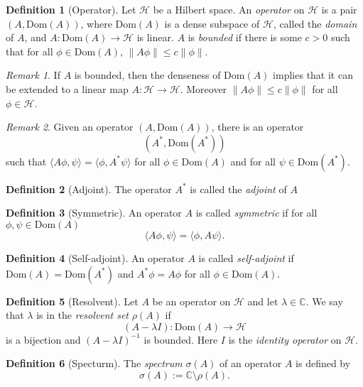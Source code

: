 \documentclass[11pt]{amsart}
\numberwithin{equation}{section}
\theoremstyle{plain}
\theoremstyle{definition}
\newtheorem{defn}{Definition}[subsection]
\theoremstyle{remark}
\newtheorem{rem}{Remark}[subsection]
\newcommand{\calH}{\mathcal{H}}
\begin{document}
\begin{defn}[Operator]
Let $\calH$ be a Hilbert space. An \emph{operator} on $\calH$ is a pair $(A,\mathrm{Dom}(A))$, where $\mathrm{Dom}(A)$ is a dense subspace of $\calH$, called the \emph{domain} of $A$, and $A\colon \mathrm{Dom}(A)\to \calH$ is linear. $A$ is \emph{bounded} if there is some $c>0$ such that for all $\phi\in \mathrm{Dom}(A)$, $\|A\phi\|\leq c\|\phi\|$.
\end{defn}

\begin{rem}
If $A$ is bounded, then the denseness of $\mathrm{Dom}(A)$ implies that it can be extended to a linear map $A\colon \calH\to \calH$. Moreover $\| A\phi\|\leq c\|\phi\|$ for all $\phi\in\calH$.
\end{rem}

\begin{rem}
Given an operator $(A,\mathrm{Dom}(A))$, there is an operator 
\[
(A^*,\mathrm{Dom}(A^*))
\]
such that $\langle  A\phi,\psi\rangle=\langle\phi,A^*\psi\rangle$ for all $\phi\in \mathrm{Dom}(A)$ and for all $\psi\in \mathrm{Dom}(A^*)$.
\end{rem}

\begin{defn}[Adjoint]
The operator $A^*$ is called the \emph{adjoint} of $A$
\end{defn}

\begin{defn}[Symmetric]
An operator $A$ is called \emph{symmetric} if for all $\phi,\psi\in \mathrm{Dom}(A)$
$$\langle A\phi,\psi\rangle=\langle \phi,A\psi\rangle.$$
\end{defn}

\begin{defn}[Self-adjoint]
An operator $A$ is called \emph{self-adjoint} if $\mathrm{Dom}(A)=\mathrm{Dom}(A^*)$ and $A^*\phi=A\phi$ for all $\phi\in \mathrm{Dom}(A)$.
\end{defn}

\begin{defn}[Resolvent]
Let $A$ be an operator on $\calH$ and let $\lambda\in\mathbb{C}$. We say that $\lambda$ is in the \emph{resolvent set} $\rho(A)$ if 
$$(A-\lambda I)\colon \mathrm{Dom}(A)\to \calH$$
is a bijection and $(A-\lambda I)^{-1}$ is bounded. Here $I$ is the \emph{identity operator} on $\calH$.
\end{defn}

\begin{defn}[Specturm]
The \emph{spectrum} $\sigma(A)$ of an operator $A$ is defined by 
\[
\sigma(A):=\mathbb{C}\setminus\rho(A).
\]
\end{defn}
\end{document}
